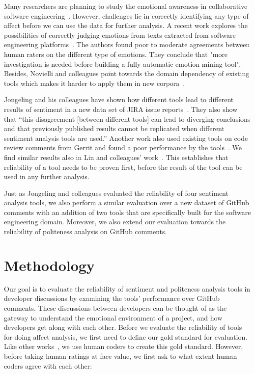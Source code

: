 Many researchers are planning to study 
the emotional awareness in collaborative software engineering~\cite{dewan2015towards}. 
However, challenges lie in correctly identifying any type of affect before we can use the data for further analysis. 
A recent work explores the possibilities of correctly judging emotions from texts extracted from software engineering platforms~\cite{murgia2014developers}. 
The authors found 
poor to moderate agreements between human raters 
on the different type of emotions. 
They conclude that 
"more investigation is needed before 
building a fully automatic emotion mining tool". 
Besides, Novielli and colleagues point towards 
the domain dependency of existing tools 
which makes it harder to apply them in new corpora~\cite{novielli2015challenges}. 

Jongeling and his colleagues have shown 
how different tools lead to different results of sentiment 
in a new data set of JIRA issue reports~\cite{jongeling2017negative}. They also show that ``this disagreement [between different tools] 
can lead to diverging conclusions 
and that previously published results cannot be replicated 
when different sentiment analysis tools are used.'' 
Another work also used existing tools 
on code review comments from Gerrit 
and found a poor performance by the tools~\cite{ahmed2017senticr}. 
We find similar results also in Lin and colleagues' work~\cite{lin2018sentiment}.
This establishes that reliability of a tool needs to be proven first, before the result of the tool can be used in any further analysis.

Just as Jongeling and colleagues 
evaluated the reliability of four sentiment analysis tools, 
we also perform a similar evaluation 
over a new dataset of GitHub comments 
with an addition of two tools 
that are specifically built for the software engineering domain. Moreover, we also extend our evaluation 
towards the reliability of politeness analysis 
on GitHub comments.  
   

\section{Methodology}

Our goal is to evaluate the reliability of sentiment and politeness analysis tools in developer discussions by examining the tools' performance over GitHub comments.
These discussions between developers can be thought of as the gateway to understand the emotional environment of a project, and how developers get along with each other. 
Before we evaluate the reliability of tools for doing affect analysis,
we first need to define our gold standard for evaluation.
Like other works~\cite{calefato2017sentiment,ahmed2017senticr}, we use human coders to create
this gold standard.
However, before taking human ratings at face value, we first ask
to what extent human coders agree with each other:

